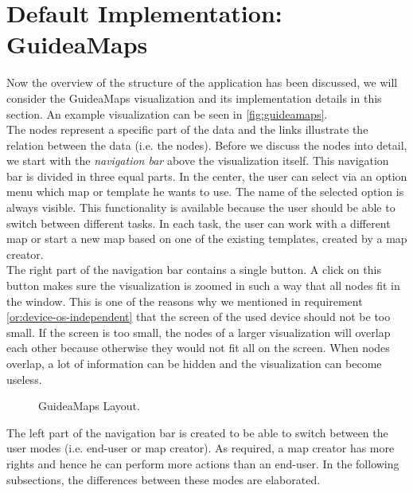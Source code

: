 \section{Default Implementation: GuideaMaps}\label{sec:default-implementation}
Now the overview of the structure of the application has been discussed, we will consider the GuideaMaps visualization and its implementation details in this section. An example visualization can be seen in \autoref{fig:guideamaps}.\\

The nodes represent a specific part of the data and the links illustrate the relation between the data (i.e. the nodes). Before we discuss the nodes into detail, we start with the \textit{navigation bar} above the visualization itself. This navigation bar is divided in three equal parts. In the center, the user can select via an option menu which map or template he wants to use. The name of the selected option is always visible. This functionality is available because the user should be able to switch between different tasks. In each task, the user can work with a different map or start a new map based on one of the existing templates, created by a map creator.\\

The right part of the navigation bar contains a single button. A click on this button makes sure the visualization is zoomed in such a way that all nodes fit in the window. This is one of the reasons why we mentioned in requirement \ref{or:device-os-independent} that the screen of the used device should not be too small. If the screen is too small, the nodes of a larger visualization will overlap each other because otherwise they would not fit all on the screen. When nodes overlap, a lot of information can be hidden and the visualization can become useless.

\begin{figure}[h]
	\centering
	\caption{GuideaMaps Layout.}
	\label{fig:guideamaps}
\end{figure}

The left part of the navigation bar is created to be able to switch between the user modes (i.e. end-user or map creator). As required, a map creator has more rights and hence he can perform more actions than an end-user. In the following subsections, the differences between these modes are elaborated.





